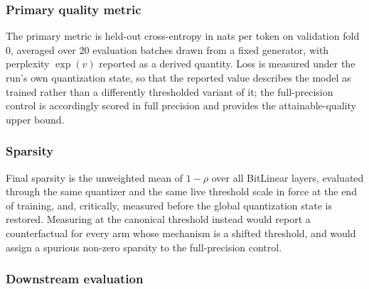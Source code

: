 \documentclass[final,5p,times,twocolumn]{elsarticle}
\theoremstyle{remark}
\begin{document}
\subsubsection{Primary quality metric}

The primary metric is held-out cross-entropy in nats per token on validation
fold $0$, averaged over $20$ evaluation batches drawn from a fixed generator,
with perplexity $\exp(v)$ reported as a derived quantity. Loss is measured under
the run's own quantization state, so that the reported value describes the model
as trained rather than a differently thresholded variant of it; the
full-precision control is accordingly scored in full precision and provides the
attainable-quality upper bound.

\subsubsection{Sparsity}

Final sparsity is the unweighted mean of $1-\rho$ over all BitLinear layers,
evaluated through the same quantizer and the same live threshold scale in force
at the end of training, and, critically, measured before the global
quantization state is restored. Measuring at the canonical threshold instead
would report a counterfactual for every arm whose mechanism is a shifted
threshold, and would assign a spurious non-zero sparsity to the full-precision
control.

\subsubsection{Downstream evaluation}
\end{document}
